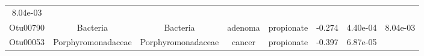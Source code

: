 \documentclass[11pt,]{article}
\begin{document}
\begin{longtable}[]{@{}cccccccc@{}}
\begin{minipage}[t]{0.08\columnwidth}
8.04e-03\strut
\end{minipage}\tabularnewline
\begin{minipage}[t]{0.08\columnwidth}\centering\strut
Otu00790\strut
\end{minipage} & \begin{minipage}[t]{0.15\columnwidth}\centering\strut
Bacteria\strut
\end{minipage} & \begin{minipage}[t]{0.15\columnwidth}\centering\strut
Bacteria\strut
\end{minipage} & \begin{minipage}[t]{0.08\columnwidth}\centering\strut
adenoma\strut
\end{minipage} & \begin{minipage}[t]{0.09\columnwidth}\centering\strut
propionate\strut
\end{minipage} & \begin{minipage}[t]{0.07\columnwidth}\centering\strut
-0.274\strut
\end{minipage} & \begin{minipage}[t]{0.08\columnwidth}\centering\strut
4.40e-04\strut
\end{minipage} & \begin{minipage}[t]{0.08\columnwidth}\centering\strut
8.04e-03\strut
\end{minipage}\tabularnewline
\begin{minipage}[t]{0.08\columnwidth}\centering\strut
Otu00053\strut
\end{minipage} & \begin{minipage}[t]{0.15\columnwidth}\centering\strut
Porphyromonadaceae\strut
\end{minipage} & \begin{minipage}[t]{0.15\columnwidth}\centering\strut
Porphyromonadaceae\strut
\end{minipage} & \begin{minipage}[t]{0.08\columnwidth}\centering\strut
cancer\strut
\end{minipage} & \begin{minipage}[t]{0.09\columnwidth}\centering\strut
propionate\strut
\end{minipage} & \begin{minipage}[t]{0.07\columnwidth}\centering\strut
-0.397\strut
\end{minipage} & \begin{minipage}[t]{0.08\columnwidth}\centering\strut
6.87e-05\strut
\end{minipage} & \begin{minipage}[t]{0.08\columnwidth}\centering\strut

\end{minipage}
\end{longtable}
\end{document}
